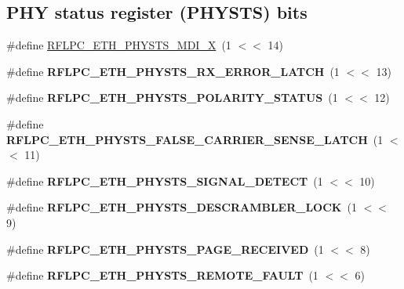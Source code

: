 \subsection*{P\-H\-Y status register (P\-H\-Y\-S\-T\-S) bits}
\begin{DoxyCompactItemize}
\item 
\#define \hyperlink{group__eth_ga0ea8ae33532af2eb4db888d3f29acd0f}{R\-F\-L\-P\-C\-\_\-\-E\-T\-H\-\_\-\-P\-H\-Y\-S\-T\-S\-\_\-\-M\-D\-I\-\_\-\-X}~(1 $<$$<$ 14)
\item 
\hypertarget{group__eth_ga46b58950404b71eab1bc17d16fe63f21}{\#define {\bfseries R\-F\-L\-P\-C\-\_\-\-E\-T\-H\-\_\-\-P\-H\-Y\-S\-T\-S\-\_\-\-R\-X\-\_\-\-E\-R\-R\-O\-R\-\_\-\-L\-A\-T\-C\-H}~(1 $<$$<$ 13)}\label{group__eth_ga46b58950404b71eab1bc17d16fe63f21}

\item 
\hypertarget{group__eth_gadb4f3adf616b5b55f87eb90af5f3717e}{\#define {\bfseries R\-F\-L\-P\-C\-\_\-\-E\-T\-H\-\_\-\-P\-H\-Y\-S\-T\-S\-\_\-\-P\-O\-L\-A\-R\-I\-T\-Y\-\_\-\-S\-T\-A\-T\-U\-S}~(1 $<$$<$ 12)}\label{group__eth_gadb4f3adf616b5b55f87eb90af5f3717e}

\item 
\hypertarget{group__eth_ga142c3ab1fc9e078b78dedbdcca693819}{\#define {\bfseries R\-F\-L\-P\-C\-\_\-\-E\-T\-H\-\_\-\-P\-H\-Y\-S\-T\-S\-\_\-\-F\-A\-L\-S\-E\-\_\-\-C\-A\-R\-R\-I\-E\-R\-\_\-\-S\-E\-N\-S\-E\-\_\-\-L\-A\-T\-C\-H}~(1 $<$$<$ 11)}\label{group__eth_ga142c3ab1fc9e078b78dedbdcca693819}

\item 
\hypertarget{group__eth_gae969388f92114f3c86ae49af250f0470}{\#define {\bfseries R\-F\-L\-P\-C\-\_\-\-E\-T\-H\-\_\-\-P\-H\-Y\-S\-T\-S\-\_\-\-S\-I\-G\-N\-A\-L\-\_\-\-D\-E\-T\-E\-C\-T}~(1 $<$$<$ 10)}\label{group__eth_gae969388f92114f3c86ae49af250f0470}

\item 
\hypertarget{group__eth_gab23250abae0ec7e9ad01933d88509c53}{\#define {\bfseries R\-F\-L\-P\-C\-\_\-\-E\-T\-H\-\_\-\-P\-H\-Y\-S\-T\-S\-\_\-\-D\-E\-S\-C\-R\-A\-M\-B\-L\-E\-R\-\_\-\-L\-O\-C\-K}~(1 $<$$<$ 9)}\label{group__eth_gab23250abae0ec7e9ad01933d88509c53}

\item 
\hypertarget{group__eth_ga83ea92ac4fd5bc1ccbdb3b3899116a58}{\#define {\bfseries R\-F\-L\-P\-C\-\_\-\-E\-T\-H\-\_\-\-P\-H\-Y\-S\-T\-S\-\_\-\-P\-A\-G\-E\-\_\-\-R\-E\-C\-E\-I\-V\-E\-D}~(1 $<$$<$ 8)}\label{group__eth_ga83ea92ac4fd5bc1ccbdb3b3899116a58}

\item 
\hypertarget{group__eth_ga763f1ae27f71c325890bfc92a2d3a0e1}{\#define {\bfseries R\-F\-L\-P\-C\-\_\-\-E\-T\-H\-\_\-\-P\-H\-Y\-S\-T\-S\-\_\-\-R\-E\-M\-O\-T\-E\-\_\-\-F\-A\-U\-L\-T}~(1 $<$$<$ 6)}\label{group__eth_ga763f1ae27f71c325890bfc92a2d3a0e1}


\end{DoxyCompactItemize}
